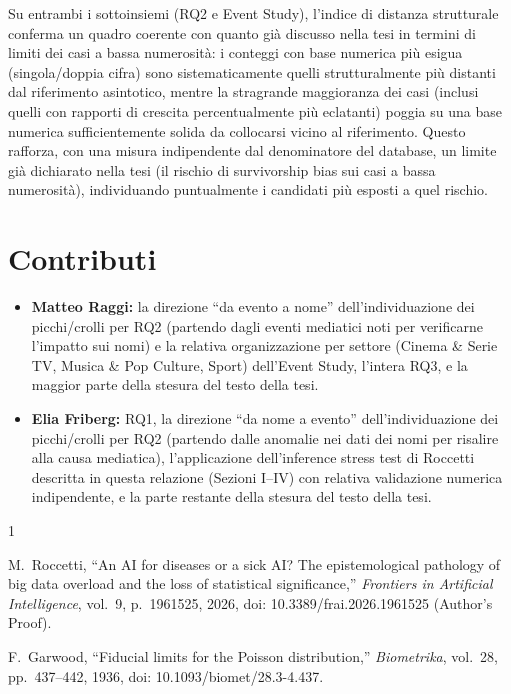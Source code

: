 \documentclass[conference]{IEEEtran}
\begin{document}
Su entrambi i sottoinsiemi (RQ2 e Event Study), l'indice di distanza strutturale conferma un
quadro coerente con quanto già discusso nella tesi in termini di limiti dei casi a bassa
numerosità: i conteggi con base numerica più esigua (singola/doppia cifra) sono
sistematicamente quelli strutturalmente più distanti dal riferimento asintotico, mentre la
stragrande maggioranza dei casi (inclusi quelli con rapporti di crescita percentualmente
più eclatanti) poggia su una base numerica sufficientemente solida da collocarsi vicino al
riferimento. Questo rafforza, con una misura indipendente dal denominatore del database, un
limite già dichiarato nella tesi (il rischio di survivorship bias sui casi a bassa
numerosità), individuando puntualmente i candidati più esposti a quel rischio.

\section*{Contributi}

\begin{itemize}
  \item \textbf{Matteo Raggi:} la direzione ``da evento a nome'' dell'individuazione dei
  picchi/crolli per RQ2 (partendo dagli eventi mediatici noti per verificarne l'impatto sui
  nomi) e la relativa organizzazione per settore (Cinema \& Serie TV, Musica \& Pop Culture,
  Sport) dell'Event Study, l'intera RQ3, e la maggior parte della stesura del testo della tesi.
  \item \textbf{Elia Friberg:} RQ1, la direzione ``da nome a evento'' dell'individuazione dei
  picchi/crolli per RQ2 (partendo dalle anomalie nei dati dei nomi per risalire alla causa
  mediatica), l'applicazione dell'inference stress test di Roccetti \cite{roccetti2026}
  descritta in questa relazione (Sezioni I--IV) con relativa validazione numerica indipendente,
  e la parte restante della stesura del testo della tesi.
\end{itemize}

\begin{thebibliography}{1}

M.~Roccetti, ``An AI for diseases or a sick AI? The epistemological pathology of big data
overload and the loss of statistical significance,'' \emph{Frontiers in Artificial
Intelligence}, vol.~9, p.~1961525, 2026, doi: 10.3389/frai.2026.1961525 (Author's Proof).

F.~Garwood, ``Fiducial limits for the Poisson distribution,'' \emph{Biometrika}, vol.~28,
pp.~437--442, 1936, doi: 10.1093/biomet/28.3-4.437.

\end{thebibliography}
\end{document}
